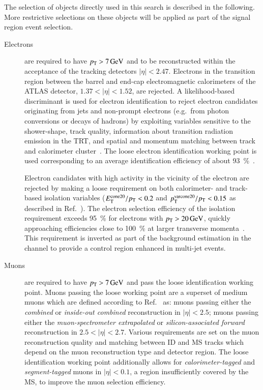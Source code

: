 The selection of objects directly used in this search is described in the
following. More restrictive selections on these objects will be applied as part
of the signal region event selection.
\begin{description}

\item[Electrons] are required to have $\pT > \SI{7}{\GeV}$ and to be
  reconstructed within the acceptance of the tracking detectors
  $|\eta| < \num{2.47}$. Electrons in the transition region between
  the barrel and end-cap electromagnetic calorimeters of the ATLAS
  detector, $1.37 < |\eta| < 1.52$, are rejected. A likelihood-based
  discriminant is used for electron identification to reject electron
  candidates originating from jets and non-prompt electrons (e.g.\
  from photon conversions or decays of hadrons) by exploiting
  variables sensitive to the shower-shape, track quality, information
  about transition radiation emission in the TRT, and spatial and
  momentum matching between track and calorimeter
  cluster~\cite{EGAM-2018-01}. The loose electron identification
  working point is used corresponding to an average identification
  efficiency of about \SI{93}{\percent}~\cite{EGAM-2018-01}.

  Electron candidates with high activity in the vicinity of the
  electron are rejected by making a loose requirement on both
  calorimeter- and track-based isolation variables
  ($E_{\text{T}}^\text{cone20} / p_{\text{T}} < 0.2$ and
  $p_{\text{T}}^{\text{varcone20}}/ p_{\text{T}} < 0.15$ as described in
  Ref.~\cite{EGAM-2018-01}). The electron selection efficiency of the
  isolation requirement exceeds \SI{95}{\percent} for electrons with
  $\pT > \SI{20}{\GeV}$, quickly approaching efficiencies close to
  \SI{100}{\percent} at larger transverse
  momenta~\cite{EGAM-2018-01}. This requirement is inverted as part of
  the \faketauhadvis background estimation in the \lephad channel to
  provide a control region enhanced in multi-jet events.



\item[Muons] are required to have $\pT > \SI{7}{\GeV}$ and pass the
  loose identification working point. Muons passing the loose working
  point are a superset of medium muons which are defined according to
  Ref.~\cite{MUON-2018-03} as: muons passing either the
  \emph{combined} or \emph{inside-out combined} reconstruction in
  $|\eta| < 2.5$; muons passing either the \emph{muon-spectrometer
    extrapolated} or \emph{silicon-associated forward} reconstruction
  in $2.5 < |\eta| < 2.7$. Various requirements are set on the muon
  reconstruction quality and matching between ID and MS tracks which
  depend on the muon reconstruction type and detector region. The
  loose identification working point additionally allows for
  \emph{calorimeter-tagged} and \emph{segment-tagged} muons in
  $|\eta| < 0.1$, a region insufficiently covered by the MS, to
  improve the muon selection efficiency.


\end{description}
